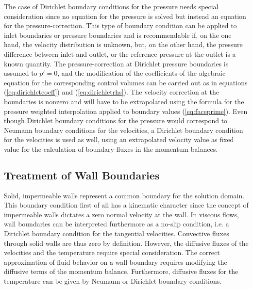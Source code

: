 The case of Dirichlet boundary conditions for the pressure needs special consideration since no equation for the pressure is solved but instead an equation for the pressure-correction. This type of boundary condition can be applied to inlet boundaries or pressure boundaries and is recommendable if, on the one hand, the velocity distribution is unknown, but, on the other hand, the pressure difference between inlet and outlet, or the reference pressure at the outlet is a known quantity. The pressure-correction at Dirichlet pressure boundaries is assumed to \(p' = 0\), and the modification of the coefficients of the algebraic equation for the corresponding control volumes can be carried out as in equations (\ref{eq:dirichletcoeff}) and (\ref{eq:dirichletrhs}). The velocity correction at the boundaries is nonzero and will have to be extrapolated using the formula for the pressure weighted interpolation applied to boundary values (\ref{eq:faceprime}). Even though Dirichlet boundary conditions for the pressure would correspond to Neumann boundary conditions for the velocities, a Dirichlet boundary condition for the velocities is used as well, using an extrapolated velocity value as fixed value for the calculation of boundary fluxes in the momentum balances. 

\subsection{Treatment of Wall Boundaries}
\label{sec:walls}
    
Solid, impermeable walls represent a common boundary for the solution domain. This boundary condition first of all has a kinematic character since the concept of impermeable walls dictates a zero normal velocity at the wall. In viscous flows, wall boundaries can be interpreted furthermore as a no-slip condition, i.e. a Dirichlet boundary condition for the tangential velocities. Convective fluxes through solid walls are thus zero by definition. However, the diffusive fluxes of the velocities and the temperature require special consideration. The correct approximation of fluid behavior on a wall boundary requires modifying the diffusive terms of the momentum balance. Furthermore, diffusive fluxes for the temperature can be given by Neumann or Dirichlet boundary conditions.

